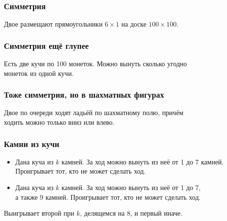 \begin{frame} \frametitle{Симметрия}
	Двое размещают прямоугольники $6 \times 1$ на доске $100 \times 100$. \medskip \pause

\begin{center}  \end{center}
\end{frame}

\begin{frame} \frametitle{Симметрия ещё глупее}
	Есть две кучи по 100 монеток. Можно вынуть сколько угодно \\
	монеток из одной кучи.
	\medskip \pause

\begin{center}  \end{center}
\end{frame}

\begin{frame} \frametitle{Тоже симметрия, но в шахматных фигурах}
	Двое по очереди ходят ладьёй по шахматному полю, причём \\
	ходить можно только вниз или влево. \medskip \pause

\begin{center}  \end{center}
\end{frame}

\begin{frame} \frametitle{Камни из кучи}
\begin{itemize} \itemsep=2.25mm
	\item Дана куча из $k$ камней. За ход можно вынуть из неё от 1 до 7 камней. Проигрывает тот, кто не может сделать ход.
	\item Дана куча из $k$ камней. За ход можно вынуть из неё от 1 до 7, \\ а также 9 камней. Проигрывает тот, кто не может сделать ход.
\end{itemize} \bigskip \pause

Выигрывает второй при $k$, делящемся на 8, и первый иначе.
\end{frame}
